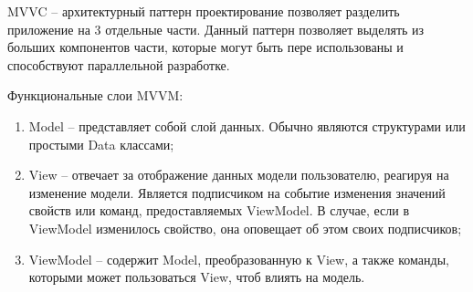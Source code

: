 
MVVC – архитектурный паттерн проектирование позволяет разделить приложение на 3 отдельные части. Данный паттерн позволяет выделять из больших компонентов части, которые могут быть пере использованы и способствуют параллельной разработке.

Функциональные слои MVVM:
\begin{enumerate}
    \item Model – представляет собой слой данных.
    Обычно являются структурами или простыми Data классами;
    \item View – отвечает за отображение данных модели пользователю, реагируя на изменение модели.
    Является подписчиком на событие изменения значений свойств или команд, предоставляемых ViewModel.
    В случае, если в ViewModel изменилось свойство, она оповещает об этом своих подписчиков;
    \item ViewModel – содержит Model, преобразованную к View, а также команды, которыми может пользоваться View, чтоб влиять на модель.
\end{enumerate}